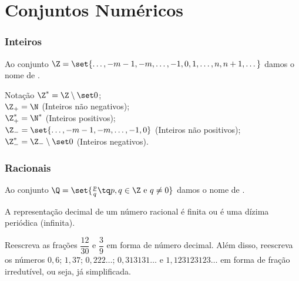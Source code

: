 
\section{Conjuntos Numéricos}



\begin{frame}
\frametitle{Inteiros} 
\begin{definicao}
Ao conjunto $\Z =\set {\dots , -m -1, -m, \dots, -1, 0, 1,  \dots ,
n, n+1, \dots}$ damos o nome de .
\end{definicao}\pause

\begin{block}{Notação}
$\Z^\ast = \Z \setminus \set 0$; \\
$\Z_+ = \N$ (Inteiros não negativos); \\
$\Z^\ast_+ =\N ^\ast$ (Inteiros positivos); \\
$\Z_- =\set {\dots , -m -1, -m, \dots, -1, 0}$ (Inteiros não
positivos); \\
$\Z_-^\ast =\Z_- \setminus \set 0$ (Inteiros negativos).
\end{block}
\end{frame}



\begin{frame}
\frametitle{Racionais} 
\begin{definicao}
Ao conjunto $\Q = \set{\frac p q \tq p, q \in \Z \text{ e } q \neq
0}$ damos o nome de .
\end{definicao}\pause

A representação decimal de um número racional é finita ou é uma
dízima periódica (infinita).
\begin{exemplo}
Reescreva as frações $\dfrac{12}{30}$ e $\dfrac 3 9 $ em forma de número decimal. Além disso, reescreva os números $0{,}6$; $1{,}37$; $0{,}222\dots$; $0{,}313131 \dots$ e $1{,}123123123 \dots$ em forma de fração irredutível, ou seja, já simplificada.
\end{exemplo}
\end{frame}



